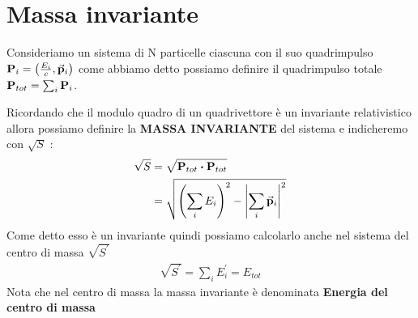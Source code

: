 \section{Massa invariante}
Consideriamo un sistema di N particelle ciascuna con il suo quadrimpulso $\vb{P}_{i} = \qty(\frac{E_{i}}{c},\va{p}_{i})$ come abbiamo detto 
possiamo definire il quadrimpulso totale $\vb{P}_{tot} = \sum_i \vb{P}_{i}$. \\
\begin{tcolorbox}[colback=red!5!white,colframe=red!50!black,title=ATTENZIONE !]
Ricordando che il modulo quadro di un quadrivettore è un invariante relativistico allora possiamo definire la \textbf{MASSA INVARIANTE} del sistema 
e indicheremo con $\sqrt{S}$ : 
\begin{align*}
    \sqrt{S} &= \sqrt{\vb{P}_{tot} \vdot \vb{P}_{tot}} \\
             &= \sqrt{\qty(\sum_i E_{i})^2 - \qty|\sum_i \va{p}_{i}|^2 }
\end{align*}
Come detto esso è un invariante quindi possiamo calcolarlo anche nel sistema del centro di massa $\sqrt{S^{\prime}}$
\begin{align*}
        \sqrt{S^{\prime}} = \sum_i E^{\prime}_{i} = E_{tot}
\end{align*}
Nota che nel centro di massa la massa invariante è denominata \textbf{Energia del centro di massa}
\end{tcolorbox}
\newpage
